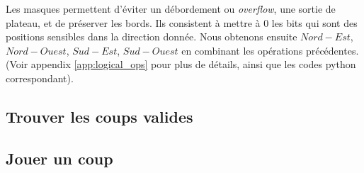 Les masques permettent d'éviter un débordement ou \textit{overflow}, une sortie de plateau, et de préserver les bords. Ils consistent à mettre à 0 les bits qui sont des positions sensibles dans la direction donnée. Nous obtenons ensuite $Nord-Est$, $Nord-Ouest$, $Sud-Est$, $Sud-Ouest$ en combinant les opérations précédentes. (Voir appendix \ref{app:logical_ops} pour plus de détails, ainsi que les codes python correspondant).

\subsection{Trouver les coups valides}
\label{subsec:valid_moves}

\subsection{Jouer un coup}
\label{subsec:play}

